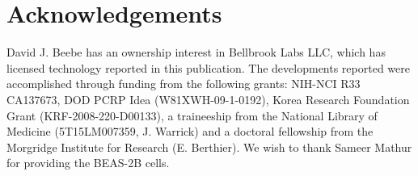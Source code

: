 \section{Acknowledgements}
David J. Beebe has an ownership interest in Bellbrook Labs LLC, which has licensed technology reported in this publication. The developments reported were accomplished through funding from the following grants: NIH-NCI R33 CA137673, DOD PCRP Idea (W81XWH-09-1-0192), Korea Research Foundation Grant (KRF-2008-220-D00133), a traineeship from the National Library of Medicine (5T15LM007359, J. Warrick) and a doctoral fellowship from the Morgridge Institute for Research (E. Berthier). We wish to thank Sameer Mathur for providing the BEAS-2B cells.